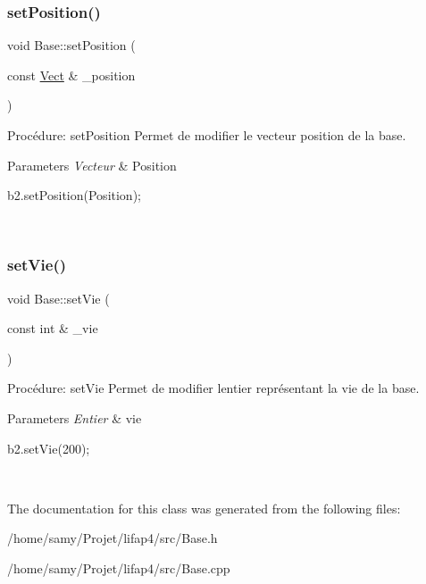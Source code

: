 \subsubsection{\texorpdfstring{set\+Position()}{setPosition()}}
{\footnotesize\ttfamily void Base\+::set\+Position (\begin{DoxyParamCaption}\item[{const \hyperlink{classVect}{Vect} \&}]{\+\_\+position }\end{DoxyParamCaption})}



Procédure\+: set\+Position Permet de modifier le vecteur position de la base. 


\begin{DoxyParams}{Parameters}
{\em Vecteur} & Position 
\begin{DoxyCode}
b2.setPosition(Position);
\end{DoxyCode}
 \\
\hline
\end{DoxyParams}
\mbox{\label{classBase_a92e0991ffd34efb2f2d6db3f3bd4093d}} 
\subsubsection{\texorpdfstring{set\+Vie()}{setVie()}}
{\footnotesize\ttfamily void Base\+::set\+Vie (\begin{DoxyParamCaption}\item[{const int \&}]{\+\_\+vie }\end{DoxyParamCaption})}



Procédure\+: set\+Vie Permet de modifier l\textquotesingle{}entier représentant la vie de la base. 


\begin{DoxyParams}{Parameters}
{\em Entier} & vie 
\begin{DoxyCode}
b2.setVie(200);
\end{DoxyCode}
 \\
\hline
\end{DoxyParams}


The documentation for this class was generated from the following files\+:\begin{DoxyCompactItemize}
\item 
/home/samy/\+Projet/lifap4/src/Base.\+h\item 
/home/samy/\+Projet/lifap4/src/Base.\+cpp\end{DoxyCompactItemize}

